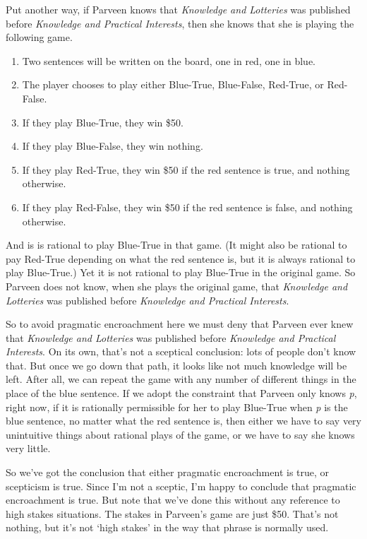 Put another way, if Parveen knows that \emph{Knowledge and Lotteries} was published before \emph{Knowledge and Practical Interests}, then she knows that she is playing the following game.

\begin{enumerate}
\item Two sentences will be written on the board, one in red, one in blue.

\item The player chooses to play either Blue-True, Blue-False, Red-True, or Red-False.

\item If they play Blue-True, they win \$50.

\item If they play Blue-False, they win nothing.

\item If they play Red-True, they win \$50 if the red sentence is true, and nothing otherwise.

\item If they play Red-False, they win \$50 if the red sentence is false, and nothing otherwise.

\end{enumerate}
And is is rational to play Blue-True in that game. (It might also be rational to pay Red-True depending on what the red sentence is, but it is always rational to play Blue-True.) Yet it is not rational to play Blue-True in the original game. So Parveen does not know, when she plays the original game, that \emph{Knowledge and Lotteries} was published before \emph{Knowledge and Practical Interests}.

So to avoid pragmatic encroachment here we must deny that Parveen ever knew that \emph{Knowledge and Lotteries} was published before \emph{Knowledge and Practical Interests}. On its own, that's not a sceptical conclusion: lots of people don't know that. But once we go down that path, it looks like not much knowledge will be left. After all, we can repeat the game with any number of different things in the place of the blue sentence. If we adopt the constraint that Parveen only knows \emph{p}, right now, if it is rationally permissible for her to play Blue-True when \emph{p} is the blue sentence, no matter what the red sentence is, then either we have to say very unintuitive things about rational plays of the game, or we have to say she knows very little.

So we've got the conclusion that either pragmatic encroachment is true, or scepticism is true. Since I'm not a sceptic, I'm happy to conclude that pragmatic encroachment is true. But note that we've done this without any reference to high stakes situations. The stakes in Parveen's game are just \$50. That's not nothing, but it's not `high stakes' in the way that phrase is normally used. 

